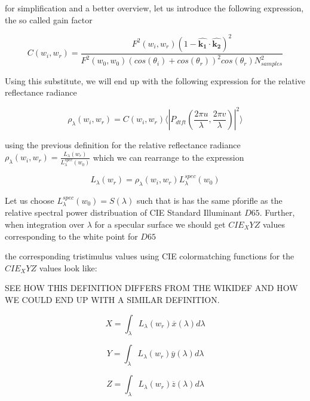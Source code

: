for simplification and a better overview, let us introduce the following expression, the so called gain factor

\begin{equation}
    C(w_i,w_r) = \frac{F^2(w_i,w_r)(1-\hat{\mathbf{k_1}}\cdot\hat{\mathbf{k_2}})^2}{F^2(w_0,w_0)(cos(\theta_i)+cos(\theta_r))^2 cos(\theta_r) N_{samples}^2}
\end{equation}

Using this substitute, we will end up with the following expression for the relative reflectance radiance

\begin{equation}
\rho_\lambda(w_i,w_r) =  C(w_i,w_r) \langle \left|P_{dtft}(\frac{2\pi u}{\lambda}, \frac{2\pi v}{\lambda})\right|^2\rangle
\end{equation}

using the previous definition for the relative reflectance radiance $\rho_\lambda(w_i,w_r) = \frac{L_\lambda(w_r)}{L_\lambda^{spec}(w_0)}$ which we can rearrange to the expression 

\begin{equation}
L_\lambda(w_r) = \rho_\lambda(w_i,w_r)L_\lambda^{spec}(w_0)
\end{equation}

Let us choose $L_\lambda^{spec}(w_0) = S(\lambda)$ such that is has the same pforifle as the relative spectral power distribuation of CIE Standard Illuminant $D65$. Further, when integration over $\lambda$ for a specular surface we should get $CIE_XYZ$ values corresponding to the white point for $D65$ 

the corresponding tristimulus values using CIE colormatching functions for the $CIE_XYZ$ values look like:

SEE HOW THIS DEFINITION DIFFERS FROM THE WIKIDEF AND HOW WE COULD END UP WITH A SIMILAR DEFINITION.

\begin{equation}
X = \int_{\lambda}L_\lambda(w_r)\overline{x}(\lambda)d\lambda
\end{equation} 

\begin{equation}
Y = \int_{\lambda}L_\lambda(w_r)\overline{y}(\lambda)d\lambda
\end{equation}

\begin{equation}
Z = \int_{\lambda}L_\lambda(w_r)\overline{z}(\lambda)d\lambda
\end{equation}

